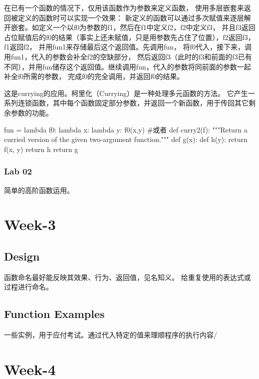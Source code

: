 \documentclass{ctexart}
\begin{document}
在已有一个函数的情况下，仅用该函数作为参数来定义函数，
使用多层嵌套来返回被定义的函数时可以实现一个效果：
新定义的函数可以通过多次赋值来逐层解开嵌套。如定义一个以f0为参数的f1，然后在f1中定义f2，f2中定义f3，
并且f3返回占位赋值后的f0的结果（事实上还未赋值，只是用参数先占住了位置），f2返回f3，f1返回f2，
并用fun1来存储最后这个返回值。先调用fun，
将f0代入，接下来，调用fun1，代入的参数会补全f2的空缺部分，
然后返回f3（此时的f3和前面的f3已有不同），并用fun储存这个返回值。继续调用fun，代入的参数将同前面的参数一起补全f0所需的参数，
完成f0的完全调用，并返回f0的结果。

这是currying的应用。柯里化（Currying）是一种处理多元函数的方法。
它产生一系列连锁函数，其中每个函数固定部分参数，并返回一个新函数，用于传回其它剩余参数的功能。

\begin{python}
    fun = lambda f0: lambda x: lambda y: f0(x,y)
    #或者
    def curry2(f):
        """Return a curried version of the given two-argument function."""
        def g(x):
            def h(y):
                return f(x, y)
            return h
        return g   
\end{python}

\subsubsection{Lab 02}

简单的高阶函数运用。

\section{Week-3}

\subsection{Design}

函数命名最好能反映其效果、行为、返回值，见名知义。
给重复使用的表达式或过程进行命名。

\subsection{Function Examples}

 一些实例，用于应付考试。通过代入特定的值来理顺程序的执行内容/
 
\section{Week-4}
\end{document}
